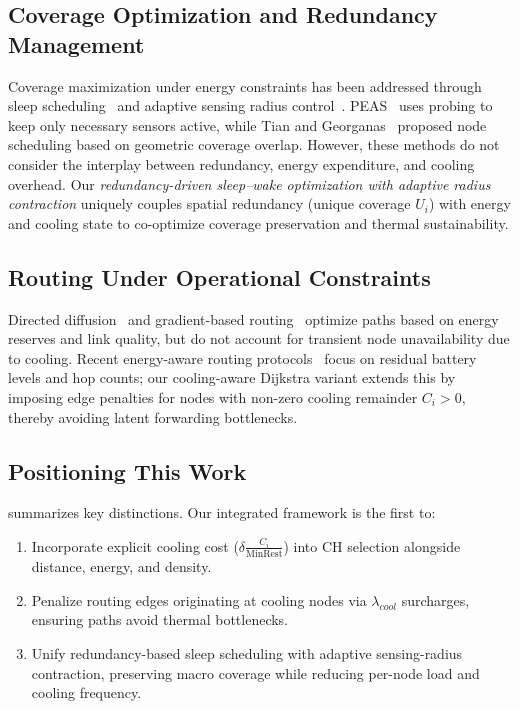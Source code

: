 \subsection{Coverage Optimization and Redundancy Management}
Coverage maximization under energy constraints has been addressed through sleep scheduling~\cite{ye2003peas,tian2002node} and adaptive sensing radius control~\cite{wang2007coverage}. PEAS~\cite{ye2003peas} uses probing to keep only necessary sensors active, while Tian and Georganas~\cite{tian2002node} proposed node scheduling based on geometric coverage overlap. However, these methods do not consider the interplay between redundancy, energy expenditure, and cooling overhead. Our \emph{redundancy-driven sleep--wake optimization with adaptive radius contraction} uniquely couples spatial redundancy (unique coverage $U_i$) with energy and cooling state to co-optimize coverage preservation and thermal sustainability.

\subsection{Routing Under Operational Constraints}
Directed diffusion~\cite{intanagonwiwat2000directed} and gradient-based routing~\cite{schurgers2002energy} optimize paths based on energy reserves and link quality, but do not account for transient node unavailability due to cooling. Recent energy-aware routing protocols~\cite{mittal2017survey} focus on residual battery levels and hop counts; our cooling-aware Dijkstra variant extends this by imposing edge penalties for nodes with non-zero cooling remainder $C_i>0$, thereby avoiding latent forwarding bottlenecks.

\subsection{Positioning This Work}
 summarizes key distinctions. Our integrated framework is the first to:
\begin{enumerate}[label=(\roman*)]
  \item Incorporate explicit cooling cost ($\delta \frac{C_i}{\text{MinRest}}$) into CH selection alongside distance, energy, and density.
  \item Penalize routing edges originating at cooling nodes via $\lambda_{cool}$ surcharges, ensuring paths avoid thermal bottlenecks.
  \item Unify redundancy-based sleep scheduling with adaptive sensing-radius contraction, preserving macro coverage while reducing per-node load and cooling frequency.
\end{enumerate}

